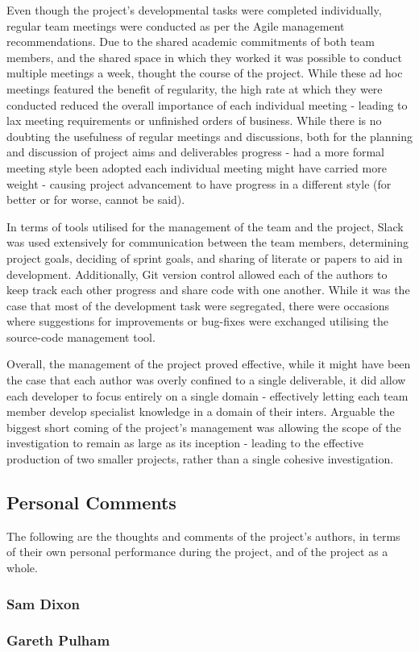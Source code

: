 Even though the project's developmental tasks were completed individually,
regular team meetings were conducted as per the Agile management
recommendations.
Due to the shared academic commitments of both team members, and the shared
space in which they worked it was possible to conduct multiple meetings a
week, thought the course of the project.
While these ad hoc meetings featured the benefit of regularity, the high rate
at which they were conducted reduced the overall importance of each individual
meeting - leading to lax meeting requirements or unfinished orders of business.
While there is no doubting the usefulness of regular meetings and discussions,
both for the planning and discussion of project aims and deliverables
progress - had a more formal meeting style been adopted each individual meeting
might have carried more weight - causing project advancement to have progress
in a different style (for better or for worse, cannot be said).

In terms of tools utilised for the management of the team and the project,
Slack was used extensively for communication between the team members,
determining project goals, deciding of sprint goals, and sharing of literate
or papers to aid in development.
Additionally, Git version control allowed each of the authors to keep track
each other progress and share code with one another.
While it was the case that most of the development task were segregated, there
were occasions where suggestions for improvements or bug-fixes were exchanged
utilising the source-code management tool.

Overall, the management of the project proved effective, while it might have
been the case that each author was overly confined to a single deliverable,
it did allow each developer to focus entirely on a single domain - effectively
letting each team member develop specialist knowledge in a domain of their
inters.
Arguable the biggest short coming of the project's management was allowing
the scope of the investigation to remain as large as its inception - leading
to the effective production of two smaller projects, rather than a single
cohesive investigation.

\subsection{Personal Comments}
The following are the thoughts and comments of the project's authors,
in terms of their own personal performance during the project, and of the
project as a whole.

\subsubsection{Sam Dixon}

\subsubsection{Gareth Pulham}

